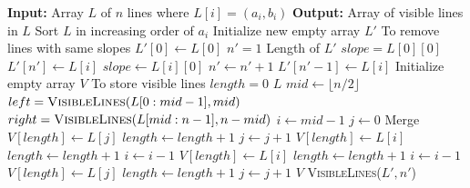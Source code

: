 \documentclass{article}
\begin{document}
  \begin{algorithm}[H]
    \caption{Visible Lines}
    \begin{algorithmic}[1]
      \State \textbf{Input:} Array $L$ of $n$ lines where $L[i] = (a_i, b_i)$
      \State \textbf{Output:} Array of visible lines in $L$
      \State Sort $L$ in increasing order of $a_i$
      \State Initialize new empty array $L'$
      \Comment To remove lines with same slopes
      \State $L'[0] \gets L[0]$
      \State $n' = 1$
      \Comment Length of $L'$
      \State $slope = L[0][0]$
          \State $L'[n'] \gets L[i]$
          \State $slope \gets L[i][0]$
          \State $n' \gets n' + 1$
          \State $L'[n'-1] \gets L[i]$
        \EndIf
      \EndFor
      \State Initialize empty array $V$
      \Comment To store visible lines
      \State $length = 0$
          \State \Return $L$
        \EndIf
        \State $mid \gets \lfloor n/2 \rfloor$
        \State $left = \textsc{VisibleLines}(L[0:mid-1], mid)$
        \State $right = \textsc{VisibleLines}(L[mid:n-1], n - mid)$
        \State $i \gets mid - 1$
        \State $j \gets 0$
          \Comment Merge
            \State $V[length] \gets L[j]$
            \State $length \gets length + 1$
            \State $j \gets j + 1$
            \State $V[length] \gets L[i]$
            \State $length \gets length + 1$
            \State $i \gets i - 1$
          \EndIf
            \State $V[length] \gets L[i]$
            \State $length \gets length + 1$
            \State $i \gets i - 1$
          \EndIf
            \State $V[length] \gets L[j]$
            \State $length \gets length + 1$
            \State $j \gets j + 1$
          \EndIf
        \EndWhile
        \State \Return $V$
      \EndFunction
      \State \Return \textsc{VisibleLines}($L', n'$)
    \end{algorithmic}
  \end{algorithm}
\end{document}
